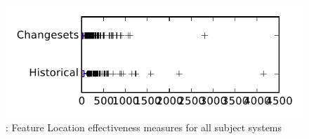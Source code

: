 
\begin{figure}
\centering
\includegraphics[height=0.4\textheight]{figures/flt/rq2_tiny}
\caption{\ftwo: Feature Location effectiveness measures for all subject systems}
\label{fig:flt:rq2:tiny}
\end{figure}
